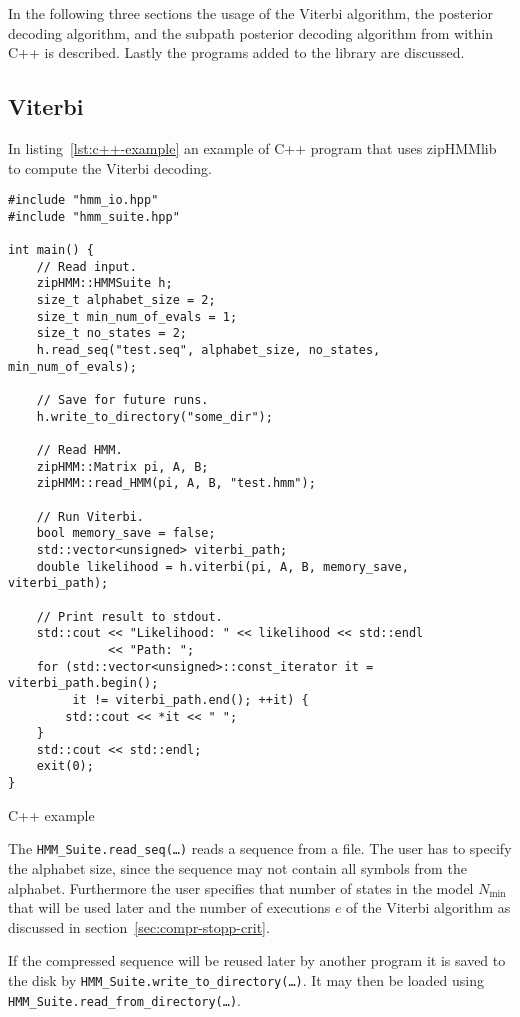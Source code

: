 In the following three sections the usage of the Viterbi algorithm, the
posterior decoding algorithm, and the subpath posterior decoding algorithm from
within C++ is described. Lastly the programs added to the library are
discussed.

\subsection{Viterbi}

In listing~\ref{lst:c++-example} an example of C++ program that uses zipHMMlib
to compute the Viterbi decoding.

\begin{listing}
\begin{verbatim}
#include "hmm_io.hpp"
#include "hmm_suite.hpp"

int main() {
    // Read input.
    zipHMM::HMMSuite h;
    size_t alphabet_size = 2;
    size_t min_num_of_evals = 1;
    size_t no_states = 2;
    h.read_seq("test.seq", alphabet_size, no_states, min_num_of_evals);

    // Save for future runs.
    h.write_to_directory("some_dir");

    // Read HMM.
    zipHMM::Matrix pi, A, B;
    zipHMM::read_HMM(pi, A, B, "test.hmm");

    // Run Viterbi.
    bool memory_save = false;
    std::vector<unsigned> viterbi_path;
    double likelihood = h.viterbi(pi, A, B, memory_save, viterbi_path);

    // Print result to stdout.
    std::cout << "Likelihood: " << likelihood << std::endl
              << "Path: ";
    for (std::vector<unsigned>::const_iterator it = viterbi_path.begin();
         it != viterbi_path.end(); ++it) {
        std::cout << *it << " ";
    }
    std::cout << std::endl;
    exit(0);
}
\end{verbatim}
\caption{C++ example}
\label{lst:c++-example}
\end{listing}

The \texttt{HMM\_Suite.read\_seq(\dots)} reads a sequence from a file. The user
has to specify the alphabet size, since the sequence may not contain all
symbols from the alphabet. Furthermore the user specifies that number of states
in the model $N_{\min}$ that will be used later and the number of executions
$e$ of the Viterbi algorithm as discussed in
section~\ref{sec:compr-stopp-crit}.

If the compressed sequence will be reused later by another program it is saved
to the disk by \texttt{HMM\_Suite.write\_to\_directory(\dots)}. It may then be
loaded using \texttt{HMM\_Suite.read\_from\_directory(\dots)}.

